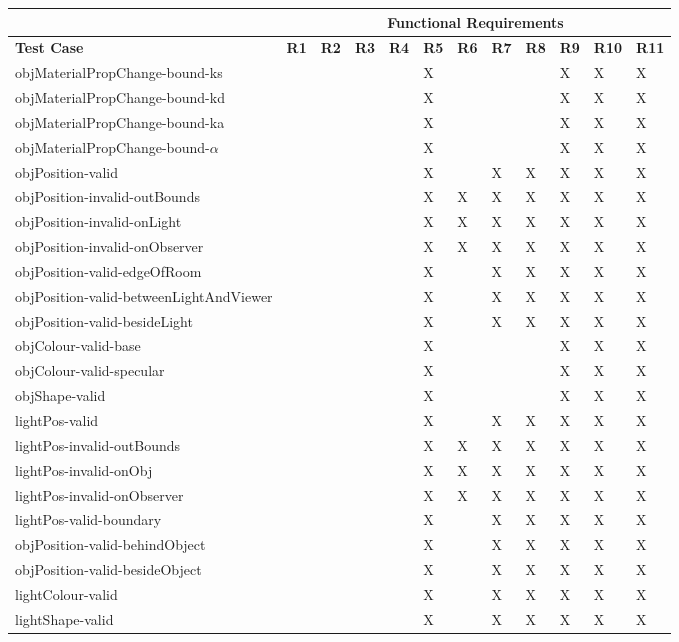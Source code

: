 \documentclass[12pt, titlepage]{article}
\begin{document}
\begin{tabular}{|p{5cm}|l|l|l|l|l|l|l|l|l|l|l}
	\hline
	& \multicolumn{11}{c}{Functional Requirements}\\
	\hline
	\textbf{Test Case} & \textbf{R1} & \textbf{R2} & \textbf{R3} & \textbf{R4} 
	& \textbf{R5} & \textbf{R6} & \textbf{R7} & \textbf{R8} & \textbf{R9} & 
	\textbf{R10} & \textbf{R11} \\
	\hline
	objMaterialPropChange-bound-ks & & & & & X & & & & X & X & X\\
	objMaterialPropChange-bound-kd & & & & & X & & & & X & X & X\\
	objMaterialPropChange-bound-ka & & & & & X & & & & X & X & X\\
	objMaterialPropChange-bound-$\alpha$ & & & & & X & & & & X & X & X\\
	objPosition-valid & & & & & X & & X	& X & X & X & X\\	
	objPosition-invalid-outBounds & & & & & X & X & X	& X & X & X & X\\
	objPosition-invalid-onLight & & & & & X & X & X	& X & X & X & X\\			
	objPosition-invalid-onObserver & & & & & X & X & X	& X & X & X & 
	X\\			
	objPosition-valid-edgeOfRoom & & & & & X & & X	& X & X & X & X\\
	objPosition-valid-betweenLightAndViewer & & & & & X & & X	& X & X & X & 
	X\\
	objPosition-valid-besideLight & & & & & X & & X	& X & X & X & X\\
	objColour-valid-base & & & & & X & & & & X & X & X\\	
	objColour-valid-specular & & & & & X & & & & X & X & X\\					
	objShape-valid & & & & & X & & & & X & X & X\\			
	lightPos-valid & & & & & X & & X & X & X & X & X\\	
	lightPos-invalid-outBounds & & & & & X & X & X	& X & X & X & X\\
	lightPos-invalid-onObj & & & & & X & X & X	& X & X & X & X\\			
	lightPos-invalid-onObserver & & & & & X & X & X	& X & X & X & X\\
	lightPos-valid-boundary & & & & & X & & X & X & X & X & X\\
	objPosition-valid-behindObject & & & & & X & & X & X & X & X & X\\
	objPosition-valid-besideObject & & & & & X & & X & X & X & X & X\\
	lightColour-valid & & & & & X & & X & X & X & X & X\\					
	lightShape-valid & & & & & X & & X & X & X & X & 
	X\\
	\hline									
\end{tabular}
\end{document}
